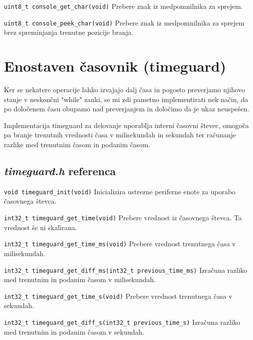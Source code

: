 \documentclass[12pt,a4paper,twoside,openright,slovene]{book}
\begin{document}
\lstinline{uint8_t console_get_char(void)}\newline
Prebere znak iz medpomnilnika za sprejem.

\lstinline{uint8_t console_peek_char(void)}\newline
Prebere znak iz medpomnilnika za sprejem brez spreminjanja trenutne pozicije branja.



\section{Enostaven časovnik (timeguard)}

Ker se nekatere operacije lahko izvajajo dalj časa in pogosto preverjamo njihovo stanje v neskončni "while" zanki, se mi zdi pametno implementirati nek način, da po določenem času obupamo nad preverjanjem in določimo da je ukaz neuspešen.

Implementacija timeguard za delovanje uporablja interni časovni števec, omogoča pa branje trenutnih vrednosti časa v milisekundah in sekundah ter računanje razlike med trenutnim časom in podanim časom.


\subsection{\textit{timeguard.h} referenca}

\lstinline{void timeguard_init(void)}\newline
Inicializira ustrezne periferne enote za uporabo časovnega števca.

\lstinline{int32_t timeguard_get_time(void)}\newline
Prebere vrednost iz časovnega števca. Ta vrednost še ni skalirana.

\lstinline{int32_t timeguard_get_time_ms(void)}\newline
Prebere vrednost trenutnega časa v milisekundah.

\lstinline{int32_t timeguard_get_diff_ms(int32_t previous_time_ms)}\newline
Izračuna razliko med trenutnim in podanim časom v milisekundah.

\lstinline{int32_t timeguard_get_time_s(void)}\newline
Prebere vrednost trenutnega časa v sekundah.

\lstinline{int32_t timeguard_get_diff_s(int32_t previous_time_s)}\newline
Izračuna razliko med trenutnim in podanim časom v sekundah.
\end{document}
